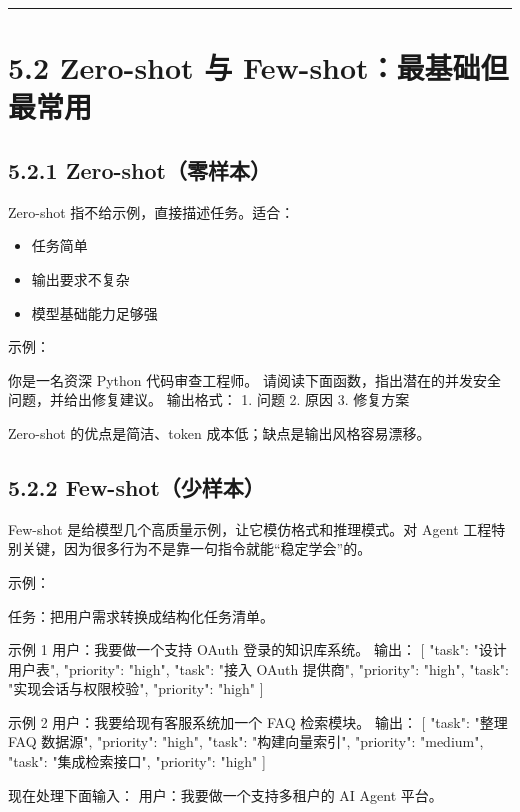 \bigskip\hrule\bigskip

\section{5.2 Zero-shot 与 Few-shot：最基础但最常用}

\subsection{5.2.1 Zero-shot（零样本）}

Zero-shot 指不给示例，直接描述任务。适合：


\begin{itemize}[leftmargin=2em]
\item 任务简单
\item 输出要求不复杂
\item 模型基础能力足够强
\end{itemize}

示例：


\begin{codeblock}
你是一名资深 Python 代码审查工程师。
请阅读下面函数，指出潜在的并发安全问题，并给出修复建议。
输出格式：
1. 问题
2. 原因
3. 修复方案
\end{codeblock}

Zero-shot 的优点是简洁、token 成本低；缺点是输出风格容易漂移。


\subsection{5.2.2 Few-shot（少样本）}

Few-shot 是给模型几个高质量示例，让它模仿格式和推理模式。对 Agent 工程特别关键，因为很多行为不是靠一句指令就能``稳定学会''的。


示例：


\begin{codeblock}
任务：把用户需求转换成结构化任务清单。

示例 1
用户：我要做一个支持 OAuth 登录的知识库系统。
输出：
[
  {"task": "设计用户表", "priority": "high"},
  {"task": "接入 OAuth 提供商", "priority": "high"},
  {"task": "实现会话与权限校验", "priority": "high"}
]

示例 2
用户：我要给现有客服系统加一个 FAQ 检索模块。
输出：
[
  {"task": "整理 FAQ 数据源", "priority": "high"},
  {"task": "构建向量索引", "priority": "medium"},
  {"task": "集成检索接口", "priority": "high"}
]

现在处理下面输入：
用户：我要做一个支持多租户的 AI Agent 平台。
\end{codeblock}

